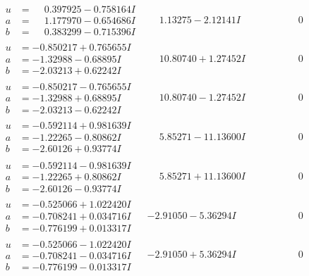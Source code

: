 \documentclass[1p]{elsarticle_modified}
\theoremstyle{definition}
\begin{document}
$$\begin{array}{c|c|c}
\begin{aligned}
u &= \phantom{-}0.397925 - 0.758164 I \\
a &= \phantom{-}1.177970 - 0.654686 I \\
b &= \phantom{-}0.383299 - 0.715396 I\end{aligned}
 & \phantom{-}1.13275 - 2.12141 I & \phantom{-0.000000 } 0 \\ \hline\begin{aligned}
u &= -0.850217 + 0.765655 I \\
a &= -1.32988 - 0.68895 I \\
b &= -2.03213 + 0.62242 I\end{aligned}
 & \phantom{-}10.80740 + 1.27452 I & \phantom{-0.000000 } 0 \\ \hline\begin{aligned}
u &= -0.850217 - 0.765655 I \\
a &= -1.32988 + 0.68895 I \\
b &= -2.03213 - 0.62242 I\end{aligned}
 & \phantom{-}10.80740 - 1.27452 I & \phantom{-0.000000 } 0 \\ \hline\begin{aligned}
u &= -0.592114 + 0.981639 I \\
a &= -1.22265 - 0.80862 I \\
b &= -2.60126 + 0.93774 I\end{aligned}
 & \phantom{-}5.85271 - 11.13600 I & \phantom{-0.000000 } 0 \\ \hline\begin{aligned}
u &= -0.592114 - 0.981639 I \\
a &= -1.22265 + 0.80862 I \\
b &= -2.60126 - 0.93774 I\end{aligned}
 & \phantom{-}5.85271 + 11.13600 I & \phantom{-0.000000 } 0 \\ \hline\begin{aligned}
u &= -0.525066 + 1.022420 I \\
a &= -0.708241 + 0.034716 I \\
b &= -0.776199 + 0.013317 I\end{aligned}
 & -2.91050 - 5.36294 I & \phantom{-0.000000 } 0 \\ \hline\begin{aligned}
u &= -0.525066 - 1.022420 I \\
a &= -0.708241 - 0.034716 I \\
b &= -0.776199 - 0.013317 I\end{aligned}
 & -2.91050 + 5.36294 I & \phantom{-0.000000 } 0 \\ \hline\begin{aligned}

\end{aligned}
\end{array}$$
\end{document}
